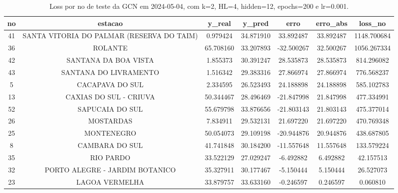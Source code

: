 \begin{table}[h]
\centering
\caption{Loss por no de teste da GCN em 2024-05-04, com k=2, HL=4, hidden=12, epochs=200 e lr=0.001.}
\label{tab:gcn_loss_k2_hl4_h12_e200_d20240504}
\begin{tabular}{ccccccc}
\toprule
no & estacao & y\_real & y\_pred & erro & erro\_abs & loss\_no \\
\midrule
41 & SANTA VITORIA DO PALMAR (RESERVA DO TAIM) & 0.979424 & 34.871910 & 33.892487 & 33.892487 & 1148.700684 \\
36 & ROLANTE & 65.708160 & 33.207893 & -32.500267 & 32.500267 & 1056.267334 \\
42 & SANTANA DA BOA VISTA & 1.855373 & 30.391247 & 28.535873 & 28.535873 & 814.296082 \\
43 & SANTANA DO LIVRAMENTO & 1.516342 & 29.383316 & 27.866974 & 27.866974 & 776.568237 \\
5 & CACAPAVA DO SUL & 2.334595 & 26.523493 & 24.188898 & 24.188898 & 585.102783 \\
13 & CAXIAS DO SUL - CRIUVA & 50.344467 & 28.496469 & -21.847998 & 21.847998 & 477.334991 \\
52 & SAPUCAIA DO SUL & 55.679798 & 33.876656 & -21.803143 & 21.803143 & 475.377014 \\
26 & MOSTARDAS & 7.834911 & 29.532131 & 21.697220 & 21.697220 & 470.769348 \\
25 & MONTENEGRO & 50.054073 & 29.109198 & -20.944876 & 20.944876 & 438.687805 \\
8 & CAMBARA DO SUL & 41.741848 & 30.184200 & -11.557648 & 11.557648 & 133.579224 \\
35 & RIO PARDO & 33.522129 & 27.029247 & -6.492882 & 6.492882 & 42.157513 \\
32 & PORTO ALEGRE - JARDIM BOTANICO & 35.327911 & 30.177467 & -5.150444 & 5.150444 & 26.527073 \\
23 & LAGOA VERMELHA & 33.879757 & 33.633160 & -0.246597 & 0.246597 & 0.060810 \\
\bottomrule
\end{tabular}
\end{table}
